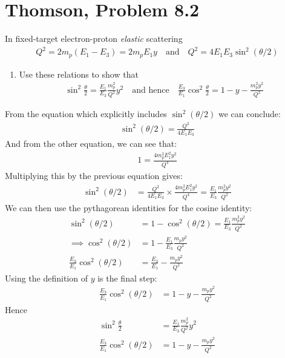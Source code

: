 \documentclass[12pt]{article}
\begin{document}
\section{Thomson, Problem 8.2}
\begin{problem}
  In fixed-target electron-proton \emph{elastic} scattering
  \begin{align*}
    Q^2=2m_p(E_1-E_3)=2m_p E_1 y\quad\text{and}
    \quad Q^2=4E_1E_3\sin^2(\theta/2)
  \end{align*}
  \begin{enumerate}[label = (\alph*)]
  \item Use these relations to show that
    \begin{align*}
      \sin^2\frac{\theta}{2}=\frac{E_1}{E_3}\frac{m_p^2}{Q^2}y^2
      \quad\text{and hence}\quad
      \frac{E_3}{E_1}\cos^2\frac{\theta}{2}=1-y-\frac{m_p^2y^2}{Q^2}
    \end{align*}
  \end{enumerate}
\end{problem}
From the equation which explicitly includes $\sin^2(\theta/2)$ we can conclude:
\begin{align*}
  \sin^2(\theta/2)=\frac{Q^2}{4E_1E_3}
\end{align*}
And from the other equation, we can see that:
\begin{align*}
  1=\frac{4m_p^2E_1^2y^2}{Q^4}
\end{align*}
Multiplying this by the previous equation gives:
\begin{align*}
  \sin^2(\theta/2)&=\frac{Q^2}{4E_1E_3}\times\frac{4m_p^2E_1^2y^2}{Q^4}
  =\frac{E_1}{E_3}\frac{m_p^2y^2}{Q^2}
\end{align*}
We can then use the pythagorean identities for the cosine identity:
\begin{align*}
  \sin^2(\theta/2)&=1-\cos^2(\theta/2)=\frac{E_1}{E_3}\frac{m_p^2y^2}{Q^2}\\
  \implies\cos^2(\theta/2)&=1-\frac{E_1}{E_3}\frac{m_p y^2}{Q^2}\\
  \frac{E_3}{E_1}\cos^2(\theta/2)&=\frac{E_3}{E_1}-\frac{m_p y^2}{Q^2}
\end{align*}
Using the definition of $y$ is the final step:
\begin{align*}
  \frac{E_3}{E_1}\cos^2(\theta/2)&=1-y-\frac{m_p y^2}{Q^2}
\end{align*}
Hence
\begin{equation}
  \label{eq:p4a}
  \boxed{
    \begin{aligned}
      \sin^2\frac{\theta}{2}&=\frac{E_1}{E_3}\frac{m_p^2}{Q^2}y^2\\
      \frac{E_3}{E_1}\cos^2(\theta/2)&=1-y-\frac{m_p y^2}{Q^2}
    \end{aligned}
  }
\end{equation}
\end{document}
